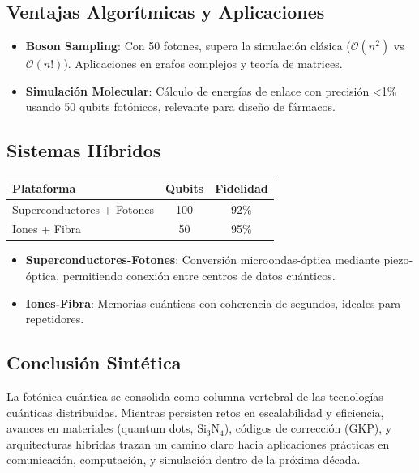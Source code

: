 \documentclass{article}
\begin{document}
\subsection*{Ventajas Algorítmicas y Aplicaciones}

\begin{itemize}
    \item \textbf{Boson Sampling}: Con 50 fotones, supera la simulación clásica ($\mathcal{O}(n^2)$ vs $\mathcal{O}(n!)$). Aplicaciones en grafos complejos y teoría de matrices.
    \item \textbf{Simulación Molecular}: Cálculo de energías de enlace con precisión <1\% usando 50 qubits fotónicos, relevante para diseño de fármacos.
\end{itemize}

\subsection*{Sistemas Híbridos}

\begin{table}[h]
\centering
\small
\begin{tabular}{lcc}
\toprule
\textbf{Plataforma} & \textbf{Qubits} & \textbf{Fidelidad} \\
\midrule
Superconductores + Fotones & 100 & 92\% \\
Iones + Fibra & 50 & 95\% \\
\bottomrule
\end{tabular}
\end{table}

\begin{itemize}
    \item \textbf{Superconductores-Fotones}: Conversión microondas-óptica mediante piezo-óptica, permitiendo conexión entre centros de datos cuánticos.
    \item \textbf{Iones-Fibra}: Memorias cuánticas con coherencia de segundos, ideales para repetidores.
\end{itemize}

\subsection*{Conclusión Sintética}

La fotónica cuántica se consolida como columna vertebral de las tecnologías cuánticas distribuidas. Mientras persisten retos en escalabilidad y eficiencia, avances en materiales (quantum dots, $\text{Si}_3\text{N}_4$), códigos de corrección (GKP), y arquitecturas híbridas trazan un camino claro hacia aplicaciones prácticas en comunicación, computación, y simulación dentro de la próxima década.
\end{document}
